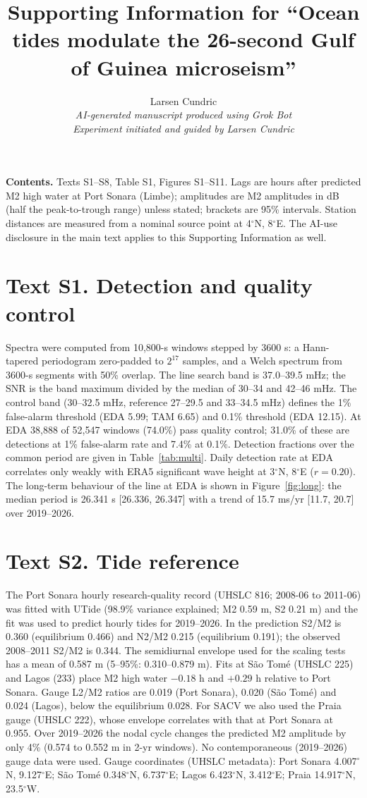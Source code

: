 \documentclass[11pt]{article}
\title{Supporting Information for ``Ocean tides modulate the 26-second Gulf of Guinea microseism''}
\author{Larsen Cundric\\[6pt]
\normalsize\textit{AI-generated manuscript produced using Grok Bot}\\
\normalsize\textit{Experiment initiated and guided by Larsen Cundric}}
\date{}
\newcommand{\degr}{\ensuremath{^\circ}}
\begin{document}
\maketitle

\noindent\textbf{Contents.} Texts S1--S8, Table S1, Figures S1--S11. Lags are hours after predicted M2 high water at Port Sonara (Limbe); amplitudes are M2 amplitudes in dB (half the peak-to-trough range) unless stated; brackets are 95\% intervals. Station distances are measured from a nominal source point at 4\degr N, 8\degr E. The AI-use disclosure in the main text applies to this Supporting Information as well.

\section*{Text S1. Detection and quality control}
Spectra were computed from 10,800-s windows stepped by 3600 s: a Hann-tapered periodogram zero-padded to $2^{17}$ samples, and a Welch spectrum from 3600-s segments with 50\% overlap. The line search band is 37.0--39.5 mHz; the SNR is the band maximum divided by the median of 30--34 and 42--46 mHz. The control band (30--32.5 mHz, reference 27--29.5 and 33--34.5 mHz) defines the 1\% false-alarm threshold (EDA 5.99; TAM 6.65) and 0.1\% threshold (EDA 12.15). At EDA 38,888 of 52,547 windows (74.0\%) pass quality control; 31.0\% of these are detections at 1\% false-alarm rate and 7.4\% at 0.1\%. Detection fractions over the common period are given in Table~\ref{tab:multi}. Daily detection rate at EDA correlates only weakly with ERA5 significant wave height at 3\degr N, 8\degr E ($r=0.20$). The long-term behaviour of the line at EDA is shown in Figure~\ref{fig:long}: the median period is 26.341 s [26.336, 26.347] with a trend of 15.7 ms/yr [11.7, 20.7] over 2019--2026.

\section*{Text S2. Tide reference}
The Port Sonara hourly research-quality record (UHSLC 816; 2008-06 to 2011-06) was fitted with UTide (98.9\% variance explained; M2 0.59 m, S2 0.21 m) and the fit was used to predict hourly tides for 2019--2026. In the prediction S2/M2 is 0.360 (equilibrium 0.466) and N2/M2 0.215 (equilibrium 0.191); the observed 2008--2011 S2/M2 is 0.344. The semidiurnal envelope used for the scaling tests has a mean of 0.587 m (5--95\%: 0.310--0.879 m). Fits at S\~ao Tom\'e (UHSLC 225) and Lagos (233) place M2 high water $-0.18$ h and $+0.29$ h relative to Port Sonara. Gauge L2/M2 ratios are 0.019 (Port Sonara), 0.020 (S\~ao Tom\'e) and 0.024 (Lagos), below the equilibrium 0.028. For SACV we also used the Praia gauge (UHSLC 222), whose envelope correlates with that at Port Sonara at 0.955. Over 2019--2026 the nodal cycle changes the predicted M2 amplitude by only 4\% (0.574 to 0.552 m in 2-yr windows). No contemporaneous (2019--2026) gauge data were used. Gauge coordinates (UHSLC metadata): Port Sonara 4.007\degr N, 9.127\degr E; S\~ao Tom\'e 0.348\degr N, 6.737\degr E; Lagos 6.423\degr N, 3.412\degr E; Praia 14.917\degr N, 23.5\degr W.
\end{document}
